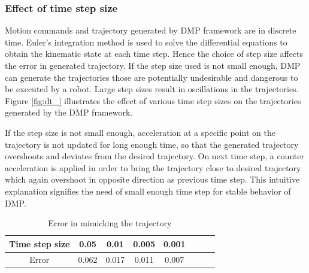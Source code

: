 \subsubsection{Effect of time step size}   
Motion commands and trajectory generated by DMP framework are in discrete time. Euler's integration method is used to solve the differential equations to obtain the kinematic state at each time step. Hence the choice of step size affects the error in generated trajectory. If the step size used is not small enough, DMP can generate the trajectories those are potentially undesirable and dangerous to be executed by a robot. Large step sizes result in oscillations in the trajectories. Figure \ref{fig:dt_} illustrates the effect of various time step sizes on the trajectories generated by the DMP framework. 

If the step size is not small enough, acceleration at a specific point on the trajectory is not updated for long enough time, so that the generated trajectory overshoots and deviates from the desired trajectory. On next time step, a counter acceleration is applied in order to bring the trajectory close to desired trajectory which again overshoot in opposite direction as previous time step. This intuitive explanation signifies the need of small enough time step for stable behavior of DMP.   


\begin{center}
	\begin{table}[H]
		\centering
		\begin{tabular}{| c | c | c | c | c | c | c | c |}	
			\hline
			Time step size & 0.05 & 0.01 & 0.005 & 0.001 \\       
			\hline
			Error & 0.062 & 0.017 & 0.011 & 0.007 \\
			\hline
		\end{tabular}
		\caption{Error in mimicking the trajectory}
	\end{table}\label{_dt_e}
\end{center}


